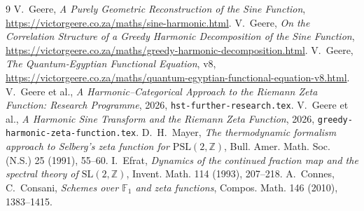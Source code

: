 \documentclass[11pt,a4paper]{article}
\theoremstyle{remark}
\begin{document}
\begin{thebibliography}{9}
 V.~Geere, \emph{A Purely Geometric Reconstruction of the Sine Function}, \url{https://victorgeere.co.za/maths/sine-harmonic.html}.
 V.~Geere, \emph{On the Correlation Structure of a Greedy Harmonic Decomposition of the Sine Function}, \url{https://victorgeere.co.za/maths/greedy-harmonic-decomposition.html}.
 V.~Geere, \emph{The Quantum‑Egyptian Functional Equation}, v8, \url{https://victorgeere.co.za/maths/quantum-egyptian-functional-equation-v8.html}.
 V.~Geere et al., \emph{A Harmonic–Categorical Approach to the Riemann Zeta Function: Research Programme}, 2026, \texttt{hst-further-research.tex}.
 V.~Geere et al., \emph{A Harmonic Sine Transform and the Riemann Zeta Function}, 2026, \texttt{greedy-harmonic-zeta-function.tex}.
 D.~H.~Mayer, \emph{The thermodynamic formalism approach to Selberg's zeta function for $\mathrm{PSL}(2,\mathbb{Z})$}, Bull. Amer. Math. Soc. (N.S.) 25 (1991), 55--60.
 I.~Efrat, \emph{Dynamics of the continued fraction map and the spectral theory of $\mathrm{SL}(2,\mathbb{Z})$}, Invent. Math. 114 (1993), 207--218.
 A.~Connes, C.~Consani, \emph{Schemes over $\mathbb{F}_1$ and zeta functions}, Compos. Math. 146 (2010), 1383--1415.
\end{thebibliography}
\end{document}
